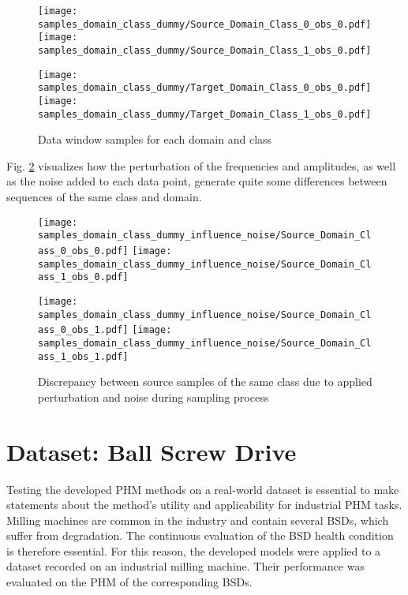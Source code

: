 \begin{figure}[H]
  \centering
  \texttt{[image: samples\_domain\_class\_dummy/Source\_Domain\_Class\_0\_obs\_0.pdf]}
  \hspace{.3cm}
  \texttt{[image: samples\_domain\_class\_dummy/Source\_Domain\_Class\_1\_obs\_0.pdf]}

  \vspace{.3cm}

  \texttt{[image: samples\_domain\_class\_dummy/Target\_Domain\_Class\_0\_obs\_0.pdf]}
  \hspace{.3cm}
  \texttt{[image: samples\_domain\_class\_dummy/Target\_Domain\_Class\_1\_obs\_0.pdf]}

  \caption{Data window samples for each domain and class}
  \label{fig:samples_domain_class_dummy}
\end{figure}

Fig. \ref{fig:samples_domain_class_dummy_influence_noise} visualizes how the perturbation of the frequencies and amplitudes, as well as the noise added to each data point, generate quite some differences between sequences of the same class and domain.

\begin{figure}[H]
  \centering
  \texttt{[image: samples\_domain\_class\_dummy\_influence\_noise/Source\_Domain\_Class\_0\_obs\_0.pdf]}
  \hspace{.3cm}
  \texttt{[image: samples\_domain\_class\_dummy\_influence\_noise/Source\_Domain\_Class\_1\_obs\_0.pdf]}

  \vspace{.3cm}

  \texttt{[image: samples\_domain\_class\_dummy\_influence\_noise/Source\_Domain\_Class\_0\_obs\_1.pdf]}
  \hspace{.3cm}
  \texttt{[image: samples\_domain\_class\_dummy\_influence\_noise/Source\_Domain\_Class\_1\_obs\_1.pdf]}

  \caption{Discrepancy between source samples of the same class due to applied perturbation and noise during sampling process}
  \label{fig:samples_domain_class_dummy_influence_noise}
\end{figure}

\section{Dataset: Ball Screw Drive}
Testing the developed PHM methods on a real-world dataset is essential to make statements about the method's utility and applicability for industrial PHM tasks. Milling machines are common in the industry and contain several BSDs, which suffer from degradation. The continuous evaluation of the BSD health condition is therefore essential. For this reason, the developed models were applied to a dataset recorded on an industrial milling machine. Their performance was evaluated on the PHM of the corresponding BSDs.

